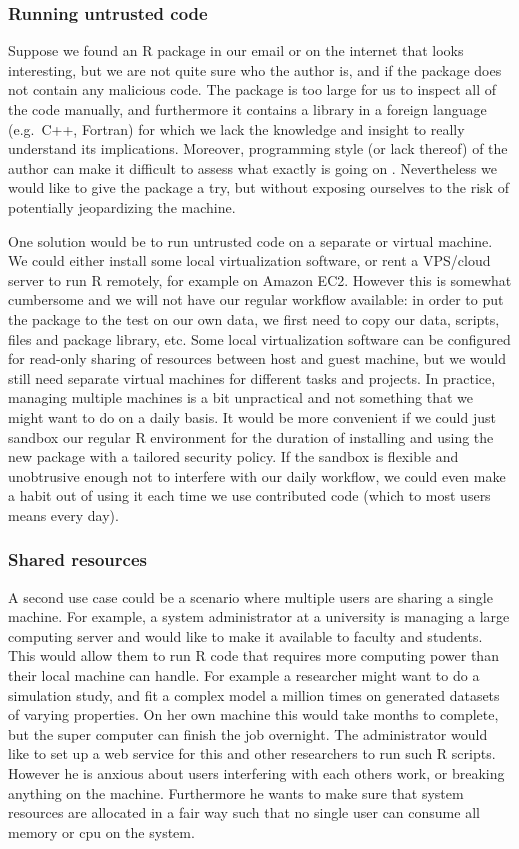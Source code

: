 \documentclass{jss}
\newcommand{\R}{\textsf{R}\xspace}
\newcommand{\Cpp}{\textsf{C++}\xspace}
\newcommand{\Fortran}{\textsf{Fortran}\xspace}
\begin{document}
\subsubsection{Running untrusted code}

Suppose we found an \R package in our email or on the internet that
looks interesting, but we are not quite sure who the author is, and if the
package does not contain any malicious code. The package is too large for us to
inspect all of the code manually, and furthermore it contains a library in a
foreign language (e.g.\ \Cpp, \Fortran) for which we lack
the knowledge and insight to really understand its implications. Moreover, 
programming style (or lack thereof) of the author can make it difficult to
assess what exactly is going on \citep{ioccc}. Nevertheless we would like to
give the package a try, but without exposing ourselves to the risk of potentially
jeopardizing the machine.

One solution would be to run untrusted code on a separate or virtual machine.
We could either install some local virtualization software, or rent a VPS/cloud
server to run R remotely, for example on Amazon EC2. However this is somewhat
cumbersome and we will not have our regular workflow available: in order to put
the package to the test on our own data, we first need to copy our data,
scripts, files and package library, etc. Some local virtualization software
can be configured for read-only sharing of resources between host and guest
machine, but we would still need separate virtual machines for different tasks
and projects. In practice, managing multiple machines is a bit unpractical and
not something that we might want to do on a daily basis. It would be more convenient if
we could just sandbox our regular \R environment for the duration of installing
and using the new package with a tailored security policy. If the sandbox is
flexible and unobtrusive enough not to interfere with our daily workflow, we could
even make a habit out of using it each time we use contributed code (which to
most users means every day).

\subsubsection{Shared resources}

A second use case could be a scenario where multiple users are sharing a single
machine. For example, a system administrator at a university is managing a large
computing server and would like to make it available to faculty and students.
This would allow them to run \R code that requires
more computing power than their local machine can handle. For example a
researcher might want to do a simulation study, and fit a complex model a
million times on generated datasets of varying properties. On her own machine
this would take months to complete, but the super computer can finish the job
overnight. The administrator would like to set up a web service for
this and other researchers to run such R scripts. However he is
anxious about users interfering with each others work, or breaking anything
on the machine. Furthermore he wants to make sure that system resources are
allocated in a fair way such that no single user can consume all memory or cpu on
the system.
\end{document}
